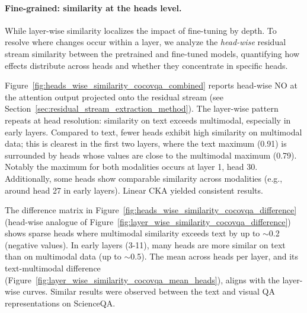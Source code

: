 \paragraph{Fine-grained: similarity at the heads level.}

While layer-wise similarity localizes the impact of fine-tuning by depth. To resolve where changes occur within a layer, we analyze the \emph{head-wise} residual stream similarity between the pretrained and fine-tuned models, quantifying how effects distribute across heads and whether they concentrate in specific heads.

Figure~\ref{fig:heads_wise_similarity_cocovqa_combined} reports head-wise NO at the attention output projected onto the residual stream (see Section~\ref{sec:residual_stream_extraction_method}). The layer-wise pattern repeats at head resolution: similarity on text exceeds multimodal, especially in early layers. Compared to text, fewer heads exhibit high similarity on multimodal data; this is clearest in the first two layers, where the text maximum (0.91) is surrounded by heads whose values are close to the multimodal maximum (0.79). Notably the maximum for both modalities occurs at layer 1, head 30. Additionally, some heads show comparable similarity across modalities (e.g., around head 27 in early layers). Linear CKA yielded consistent results.

The difference matrix in Figure~\ref{fig:heads_wise_similarity_cocovqa_difference} (head-wise analogue of Figure~\ref{fig:layer_wise_similarity_cocovqa_difference}) shows sparse heads where multimodal similarity exceeds text by up to $\sim$0.2 (negative values). In early layers (3-11), many heads are more similar on text than on multimodal data (up to $\sim$0.5). The mean across heads per layer, and its text-multimodal difference (Figure~\ref{fig:layer_wise_similarity_cocovqa_mean_heads}), aligns with the layer-wise curves. Similar results were observed between the text and visual QA representations on ScienceQA.

